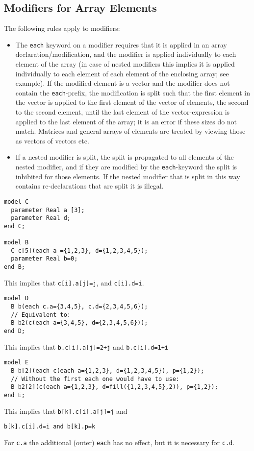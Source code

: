 \subsection{Modifiers for Array Elements}

The following rules apply to modifiers:
\begin{itemize}
\item
  The \lstinline!each! keyword on a modifier requires that it is applied in an array
  declaration/modification, and the modifier is applied individually to
  each element of the array (in case of nested modifiers this implies it
  is applied individually to each element of each element of the
  enclosing array; see example). If the modified element is a vector and
  the modifier does not contain the \lstinline!each!-prefix, the modification is
  split such that the first element in the vector is applied to the
  first element of the vector of elements, the second to the second
  element, until the last element of the vector-expression is applied to
  the last element of the array; it is an error if these sizes do not
  match. Matrices and general arrays of elements are treated by viewing
  those as vectors of vectors etc.
\item
  If a nested modifier is split, the split is propagated to all elements
  of the nested modifier, and if they are modified by the \lstinline!each!-keyword
  the split is inhibited for those elements. If the nested modifier that
  is split in this way contains re-declarations that are split it is
  illegal.
\end{itemize}

\begin{example}
\begin{lstlisting}[language=modelica]
model C
  parameter Real a [3];
  parameter Real d;
end C;

model B
  C c[5](each a ={1,2,3}, d={1,2,3,4,5});
  parameter Real b=0;
end B;
\end{lstlisting}
This implies that \lstinline!c[i].a[j]=j!, and \lstinline!c[i].d=i!.

\begin{lstlisting}[language=modelica]
model D
  B b(each c.a={3,4,5}, c.d={2,3,4,5,6});
  // Equivalent to:
  B b2(c(each a={3,4,5}, d={2,3,4,5,6}));
end D;
\end{lstlisting}
This implies that \lstinline!b.c[i].a[j]=2+j! and \lstinline!b.c[i].d=1+i!
\begin{lstlisting}[language=modelica]
model E
  B b[2](each c(each a={1,2,3}, d={1,2,3,4,5}), p={1,2});
  // Without the first each one would have to use:
  B b2[2](c(each a={1,2,3}, d=fill({1,2,3,4,5},2)), p={1,2});
end E;
\end{lstlisting}
This implies that \lstinline!b[k].c[i].a[j]=j! and
\begin{lstlisting}[language=modelica]
  b[k].c[i].d=i and b[k].p=k
\end{lstlisting}
For \lstinline!c.a! the additional (outer) \lstinline!each! has no effect, but it is
necessary for \lstinline!c.d!.
\end{example}

